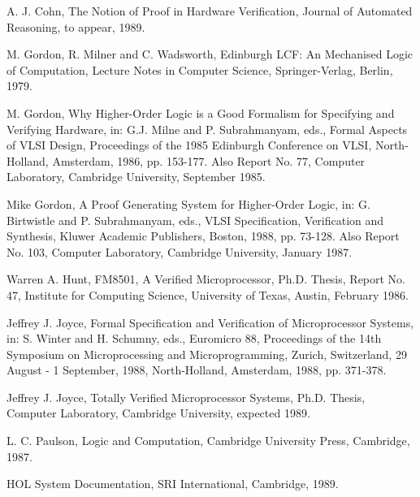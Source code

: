 \begin{normalsize}
\begin{thebibliography}{12}
A. J. Cohn,
The Notion of Proof in Hardware Verification,
Journal of Automated Reasoning, to appear, 1989.

M. Gordon, R. Milner and C. Wadsworth,
Edinburgh LCF: An Mechanised Logic of Computation,
Lecture Notes in Computer Science,
Springer-Verlag,
Berlin,
1979.

M. Gordon,
Why Higher-Order Logic is a Good Formalism
for Specifying and Verifying Hardware, in:
G.J. Milne and P. Subrahmanyam, eds.,
Formal Aspects of VLSI Design,
Proceedings of the 1985 Edinburgh Conference on VLSI,
North-Holland, Amsterdam,
1986,
pp. 153-177.
Also Report No. 77, Computer Laboratory, Cambridge University,
September 1985.

Mike Gordon,
A Proof Generating System for Higher-Order Logic, in:
G. Birtwistle and P. Subrahmanyam, eds.,
VLSI Specification, Verification and Synthesis,
Kluwer Academic Publishers, Boston, 1988,
pp. 73-128.
Also Report No. 103, Computer Laboratory, Cambridge University,
January 1987.

Warren A. Hunt,
FM8501, A Verified Microprocessor,
Ph.D. Thesis, Report No. 47,
Institute for Computing Science, University of Texas, Austin,
February 1986.

Jeffrey J. Joyce,
Formal Specification and Verification of Microprocessor Systems, in:
S. Winter and H. Schumny, eds.,
Euromicro 88,
Proceedings of the 14th Symposium on Microprocessing and Microprogramming,
Zurich, Switzerland, 29 August - 1 September, 1988,
North-Holland, Amsterdam, 1988,
pp. 371-378.

Jeffrey J. Joyce,
Totally Verified Microprocessor Systems,
Ph.D. Thesis, Computer Laboratory, Cambridge University,
expected 1989.

L. C. Paulson,
Logic and Computation,
Cambridge University Press,
Cambridge,
1987.

HOL System Documentation,
SRI International,
Cambridge,
1989.

\end{thebibliography}

\end{normalsize}


